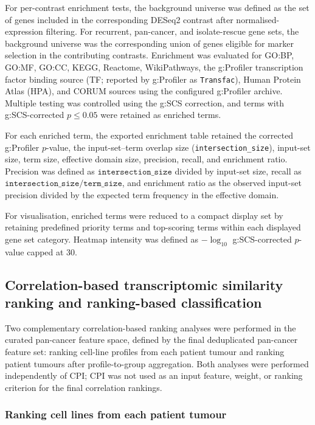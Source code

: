 For per-contrast enrichment tests, the background universe was defined as the set
of genes included in the corresponding DESeq2 contrast after normalised-expression
filtering. For recurrent, pan-cancer, and isolate-rescue gene sets, the
background universe was the corresponding union of genes eligible for marker
selection in the contributing contrasts. Enrichment was evaluated for GO:BP,
GO:MF, GO:CC, KEGG, Reactome, WikiPathways, the g:Profiler transcription factor
binding source (TF; reported by g:Profiler as \texttt{Transfac}), Human Protein
Atlas (HPA), and CORUM sources using the configured g:Profiler archive. Multiple
testing was controlled using the g:SCS correction, and terms with
g:SCS-corrected \(p \leq 0.05\) were retained as enriched terms.

For each enriched term, the exported enrichment table retained the corrected
g:Profiler \(p\)-value, the input-set--term overlap size
(\texttt{intersection\_size}), input-set size, term size, effective domain
size, precision, recall, and enrichment ratio. Precision was defined as
\(\texttt{intersection\_size}\) divided by input-set size, recall as
\(\texttt{intersection\_size}/\texttt{term\_size}\), and enrichment
ratio as the observed input-set precision divided by the expected term
frequency in the effective domain.

For visualisation, enriched terms were reduced to a compact display set
by retaining predefined priority terms and top-scoring terms within each
displayed gene set category. Heatmap intensity was defined as
\(-\log_{10}\) g:SCS-corrected \(p\)-value capped at 30.

\subsection{Correlation-based transcriptomic similarity ranking and ranking-based classification}

Two complementary correlation-based ranking analyses were performed in the
curated pan-cancer feature space, defined by the final deduplicated pan-cancer
feature set: ranking cell-line profiles from each patient tumour and ranking
patient tumours after profile-to-group aggregation. Both analyses were
performed independently of CPI; CPI was not used as an input feature, weight, or
ranking criterion for the final correlation rankings.

\subsubsection{Ranking cell lines from each patient tumour}

